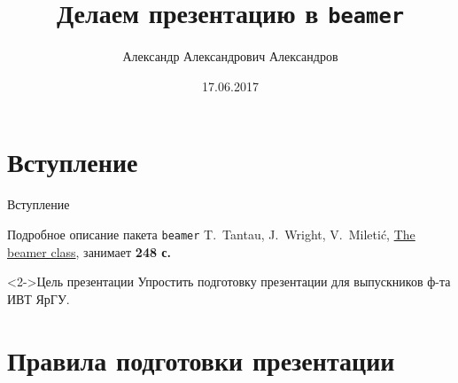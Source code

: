 \documentclass[fullscreen=true,russian,compress,%
	hyperref={unicode,bookmarks=false}]{presentation}
\begin{document}

\title[Презентация в \texttt{beamer}]{Делаем презентацию в \texttt{beamer}}
\author{Александр Александрович Александров}
\date{17.06.2017}

\begin{frame}
\titlepage
\end{frame}


\section{Вступление}

\begin{frame}{Вступление}

\begin{block}{Подробное описание пакета \texttt{beamer}}
T.~Tantau, J.~Wright, V.~Mileti\'c,
\href{https://www.ctan.org/tex-archive/macros/latex/contrib/beamer}{The beamer class}, занимает \textbf{248 с.}
\end{block}	

\begin{block}<2->{Цель презентации}
	Упростить подготовку презентации для выпускников ф-та ИВТ ЯрГУ.
\end{block}	

\end{frame}


\section{Правила подготовки презентации}
\end{document}

